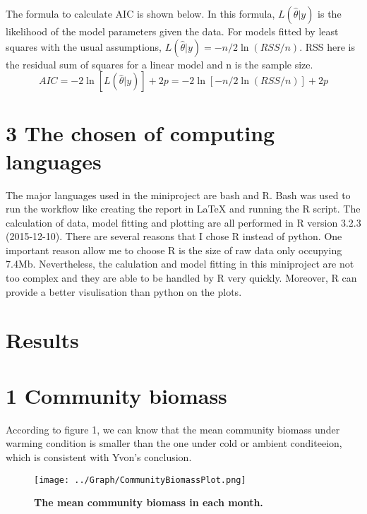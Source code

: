 \documentclass[11pt]{article}
\begin{document}
\begin{linenumbers}
The formula to calculate AIC is shown below. In this formula, $L(\hat{\theta}|y)$ is the likelihood of the model parameters given the data. For models fitted by least squares with the usual assumptions,
$L(\hat{\theta}|y)=-n/2\ln(RSS/n)$. RSS here is the residual sum of squares for a linear model and n is the sample size.
\begin{equation}
AIC = -2 \ln [ L (\hat{\theta}|y)] + 2 p = -2 \ln [-n/2\ln(RSS/n)] + 2 p
\end{equation}

\section*{3 The chosen of computing languages}
The major languages used in the miniproject are bash and R. Bash was used to run the workflow like creating the report in LaTeX and running the R script. The calculation of data, model fitting and plotting are all performed in R version 3.2.3 (2015-12-10). There are several reasons that I chose R instead of python. One important reason allow me to choose R is the size of raw data only occupying 7.4Mb. Nevertheless, the calulation and model fitting in this miniproject are not too complex and  they are able to be handled by R very quickly. Moreover, R can provide a better visulisation than python on the plots.

\section*{Results}
\section*{1 Community biomass}
According to figure 1, we can know that the mean community biomass under warming condition is smaller than the one under cold or ambient conditeeion, which is consistent with Yvon's conclusion.
\begin{figure}[H]
  \centering
  \texttt{[image: ../Graph/CommunityBiomassPlot.png]}
  \caption{\textbf{The mean community biomass in each month.}  }
\end{figure}


\end{linenumbers}
\end{document}
